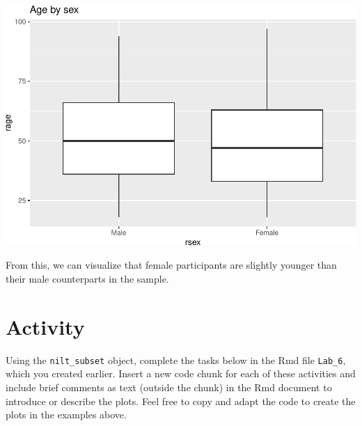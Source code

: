 \documentclass[
]{book}
\begin{document}
\begin{flushleft}\includegraphics[width=1\linewidth]{lab-workbook_files/figure-latex/unnamed-chunk-72-1} \end{flushleft}

From this, we can visualize that female participants are slightly younger than their male counterparts in the sample.

\hypertarget{activity-6}{%
\section{Activity}\label{activity-6}}

Using the \texttt{nilt\_subset} object, complete the tasks below in the Rmd file \texttt{Lab\_6}, which you created earlier. Insert a new code chunk for each of these activities and include brief comments as text (outside the chunk) in the Rmd document to introduce or describe the plots. Feel free to copy and adapt the code to create the plots in the examples above.
\end{document}
